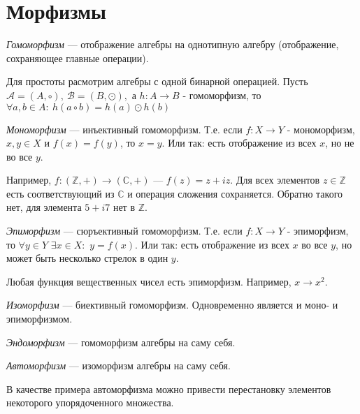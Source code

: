 \section{Морфизмы}


\begin{definition}
    {\it Гомоморфизм} --- отображение алгебры на однотипную алгебру (отображение, сохраняющее главные операции).
\end{definition}

\begin{example}
    Для простоты расмотрим алгебры с одной бинарной операцией. Пусть $\mathcal{A} = (A, \circ),\ \mathcal{B} = (B, \odot),$ а $h: A \to B$ - гомоморфизм, то $\forall a, b \in A:\ h(a \circ b) = h(a) \odot h(b)$
\end{example}

\begin{definition}
    {\it Мономорфизм} --- инъективный гомоморфизм. Т.е. если $f:X\to Y$ - мономорфизм, $x, y\in X$ и $f(x)=f(y)$, то $x=y$. Или так: есть отображение из всех $x$, но не во все $y$.
\end{definition}

\begin{example}
    Например, $f: (\mathbb{Z}, +) \to (\mathbb{C}, +)$ --- $f(z)=z+iz$. Для всех элементов $z\in \mathbb{Z}$ есть соответствующий из $\mathbb{C}$ и операция сложения сохраняется. Обратно такого нет, для элемента $5+i7$ нет в $\mathbb{Z}$.
\end{example}

\begin{definition}
    {\it Эпиморфизм} --- сюръективный гомоморфизм. Т.е. если $f:X\to Y$ - эпиморфизм, то $\forall y\in Y$ $\exists x\in X:$ $y=f(x)$. Или так: есть отображение из всех $x$ во все $y$, но может быть несколько стрелок в один $y$.
\end{definition}

\begin{example}
    Любая функция вещественных чисел есть эпиморфизм. Например, $x \to x^2$.
\end{example}

\begin{definition}
    {\it Изоморфизм} --- биективный гомоморфизм. Одновременно является и моно- и эпиморфизмом.
\end{definition}

\begin{definition}
    {\it Эндоморфизм} --- гомоморфизм алгебры на саму себя.
\end{definition}

\begin{definition}
    {\it Автоморфизм} --- изоморфизм алгебры на саму себя.
\end{definition}

В качестве примера автоморфизма можно привести перестановку элементов некоторого упорядоченного множества.
